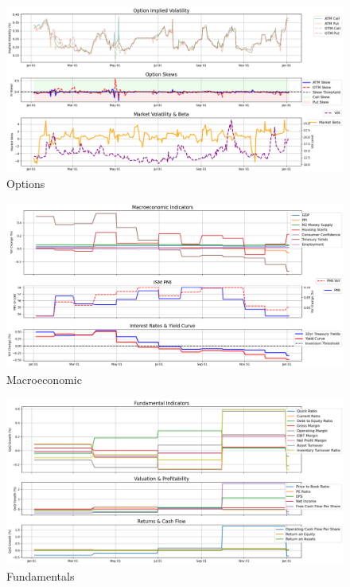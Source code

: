 \documentclass[8pt]{scrartcl}
\begin{document}
\begin{figure}[H]
    \centering
    \includegraphics[width=1\linewidth]{judge_reviews/AAPL_M_gpt-4o-mini/2015-01-05/judge_Option_Implied_Volatility.png}
    \caption{Options}
\end{figure}

\begin{figure}[H]
    \centering
    \includegraphics[width=1\linewidth]{judge_reviews/AAPL_M_gpt-4o-mini/2015-01-05/judge_Macroeconomic_Indicators.png}
    \caption{Macroeconomic}
\end{figure}

\begin{figure}[H]
    \centering
    \includegraphics[width=1\linewidth]{judge_reviews/AAPL_M_gpt-4o-mini/2015-01-05/judge_Fundamental_Indicators.png}
    \caption{Fundamentals}
\end{figure}
\end{document}

